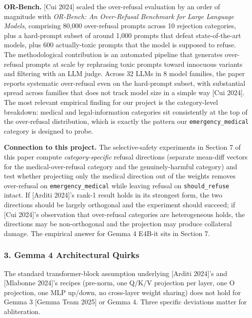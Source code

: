 \documentclass[
  11pt,
]{article}
\begin{document}
\textbf{OR-Bench.} {[}Cui 2024{]} scaled the over-refusal evaluation by
an order of magnitude with \emph{OR-Bench: An Over-Refusal Benchmark for
Large Language Models}, comprising 80,000 over-refusal prompts across 10
rejection categories, plus a hard-prompt subset of around 1,000 prompts
that defeat state-of-the-art models, plus 600 actually-toxic prompts
that the model is supposed to refuse. The methodological contribution is
an automated pipeline that generates over-refusal prompts at scale by
rephrasing toxic prompts toward innocuous variants and filtering with an
LLM judge. Across 32 LLMs in 8 model families, the paper reports
systematic over-refusal even on the hard-prompt subset, with substantial
spread across families that does not track model size in a simple way
{[}Cui 2024{]}. The most relevant empirical finding for our project is
the category-level breakdown: medical and legal-information categories
sit consistently at the top of the over-refusal distribution, which is
exactly the pattern our \texttt{emergency\_medical} category is designed
to probe.

\textbf{Connection to this project.} The selective-safety experiments in
Section 7 of this paper compute \emph{category-specific} refusal
directions (separate mean-diff vectors for the medical-over-refusal
category and the genuinely-harmful category) and test whether projecting
only the medical direction out of the weights removes over-refusal on
\texttt{emergency\_medical} while leaving refusal on
\texttt{should\_refuse} intact. If {[}Arditi 2024{]}'s rank-1 result
holds in its strongest form, the two directions should be largely
orthogonal and the experiment should succeed; if {[}Cui 2024{]}'s
observation that over-refusal categories are heterogeneous holds, the
directions may be non-orthogonal and the projection may produce
collateral damage. The empirical answer for Gemma 4 E4B-it sits in
Section 7.

\subsubsection{3. Gemma 4 Architectural
Quirks}\label{gemma-4-architectural-quirks}

The standard transformer-block assumption underlying {[}Arditi 2024{]}'s
and {[}Mlabonne 2024{]}'s recipes (pre-norm, one Q/K/V projection per
layer, one O projection, one MLP up/down, no cross-layer weight sharing)
does not hold for Gemma 3 {[}Gemma Team 2025{]} or Gemma 4. Three
specific deviations matter for abliteration.
\end{document}

